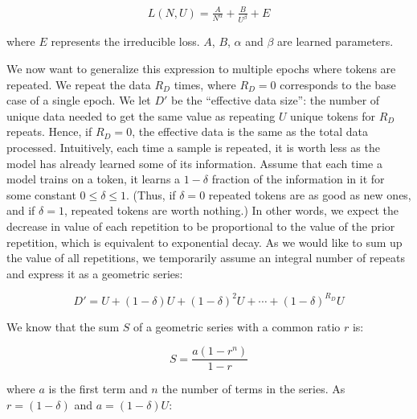 \documentclass{article}
\begin{document}
\begin{equation}\label{eq:cc}
L(N,U) = \tfrac{A}{N^\alpha} + \tfrac{B}{U^\beta} + E
\end{equation}

where $E$ represents the irreducible loss. $A$, $B$, $\alpha$ and $\beta$ are learned parameters.


We now want to generalize this expression to multiple epochs where tokens are repeated. We repeat the data $R_D$ times, where $R_D=0$ corresponds to the base case of a single epoch. We let $D'$ be the ``effective data size'': the number of unique data needed to get the same value as repeating $U$ unique tokens for $R_D$ repeats. Hence, if $R_D=0$, the effective data is the same as the total data processed. Intuitively, each time a sample is repeated, it is worth less as the model has already learned some of its information. Assume that each time a model trains on a token, it learns a $1-\delta$ fraction of the information in it for some constant $0 \leq \delta \leq 1$. (Thus,
if $\delta=0$ repeated tokens are as good as new ones, and if $\delta=1$, repeated tokens are worth nothing.) In other words, we expect the decrease in value of each repetition to be proportional to the value of the prior repetition, which is equivalent to exponential decay. As we would like to sum up the value of all repetitions, we temporarily assume an integral number of repeats and express it as a geometric series:

\begin{equation}\label{eq:ccu}
D' = U + (1-\delta)U + (1-\delta)^{2}U + \cdots + (1-\delta)^{R_D}U
\end{equation}


We know that the sum $S$ of a geometric series with a common ratio $r$ is:

\begin{equation}\label{eq:geos}
S = \frac{a(1-r^n)}{1-r}
\end{equation}

where $a$ is the first term and $n$ the number of terms in the series. As $r=(1-\delta)$ and $a=(1-\delta)U$:

\end{document}
